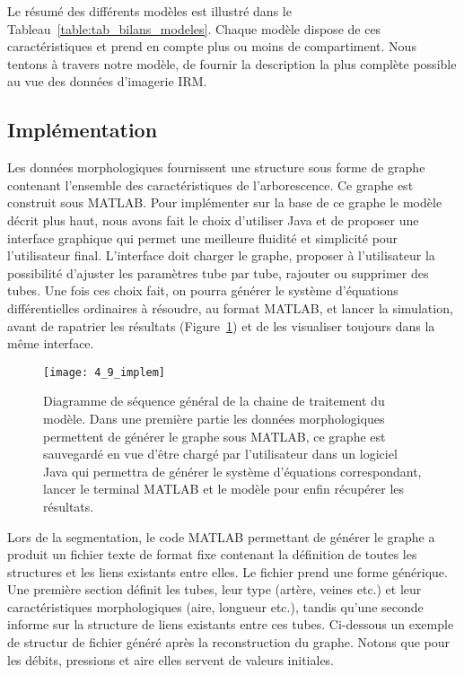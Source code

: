 Le résumé des différents modèles est illustré dans le Tableau~\ref{table:tab_bilans_modeles}. Chaque modèle dispose de ces caractéristiques et prend en compte plus ou moins de compartiment. Nous tentons à travers notre modèle, de fournir la description la plus complète possible au vue des données d'imagerie IRM.






\subsection{Implémentation}
Les données morphologiques fournissent une structure sous forme de graphe contenant
l’ensemble des caractéristiques de l’arborescence. Ce graphe est construit sous MATLAB. Pour
implémenter sur la base de ce graphe le modèle décrit plus haut, nous avons fait le choix d’utiliser Java
et de proposer une interface graphique qui permet une meilleure fluidité et simplicité pour l’utilisateur
final. L’interface doit charger le graphe, proposer à l’utilisateur la possibilité d’ajuster les paramètres
tube par tube, rajouter ou supprimer des tubes. Une fois ces choix fait, on pourra générer le système
d’équations différentielles ordinaires à résoudre, au format MATLAB, et lancer la simulation, avant de
rapatrier les résultats (Figure~\ref{fig:4_9_implem}) et de les visualiser toujours dans la même interface.\\
\begin{figure}[!t]
\centering
\texttt{[image: 4\_9\_implem]}
\caption{Diagramme de séquence général de la chaine de traitement du modèle. Dans une première partie les données
morphologiques permettent de générer le graphe sous MATLAB, ce graphe est sauvegardé en vue d’être chargé par
l’utilisateur dans un logiciel Java qui permettra de générer le système d’équations correspondant, lancer le terminal MATLAB
et le modèle pour enfin récupérer les résultats.}
\label{fig:4_9_implem}	
\end{figure}
Lors de la segmentation, le code MATLAB permettant de générer le graphe a produit un fichier texte
de format fixe contenant la définition de toutes les structures et les liens existants entre elles. Le fichier
prend une forme générique. Une première section définit les tubes, leur type (artère, veines etc.) et
leur caractéristiques morphologiques (aire, longueur etc.), tandis qu’une seconde informe sur la
structure de liens existants entre ces tubes. Ci-dessous un exemple de structur de fichier généré après la reconstruction du graphe. Notons que pour les débits, pressions et aire elles
servent de valeurs initiales.

